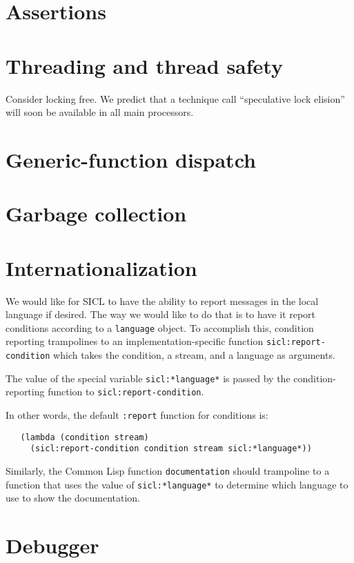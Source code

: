 \documentclass{article}
\def\sysname{SICL}
\begin{document}
\section{Assertions}

\section{Threading and thread safety}

Consider locking free.  We predict that a technique call ``speculative
lock elision'' will soon be available in all main processors. 

\section{Generic-function dispatch}

\section{Garbage collection}

\section{Internationalization}

We would like for {\sysname} to have the ability to report messages in
the local language if desired.  The way we would like to do that is to
have it report conditions according to a \texttt{language} object.  To
accomplish this, condition reporting trampolines to an
implementation-specific function \texttt{sicl:report-condition} which
takes the condition, a stream, and a language as arguments.

The value of the special variable \texttt{sicl:*language*} is passed
by the condition-reporting function to \texttt{sicl:report-condition}.

In other words, the default \texttt{:report} function for conditions is:

\begin{verbatim}
   (lambda (condition stream) 
     (sicl:report-condition condition stream sicl:*language*))
\end{verbatim}

Similarly, the Common Lisp function \texttt{documentation} should
trampoline to a function that uses the value of
\texttt{sicl:*language*} to determine which language to use to show
the documentation. 

\section{Debugger}
\end{document}
